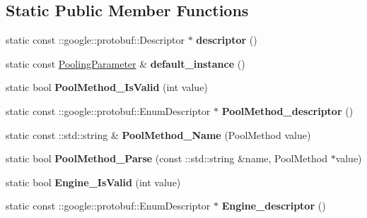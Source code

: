 \subsection*{Static Public Member Functions}
\begin{DoxyCompactItemize}
\item 
\mbox{\label{classcaffe_1_1_pooling_parameter_aa542d3765744ae40a109c427950d0617}} 
static const \+::google\+::protobuf\+::\+Descriptor $\ast$ {\bfseries descriptor} ()
\item 
\mbox{\label{classcaffe_1_1_pooling_parameter_ae648221442a7b54923a37772abd9d5cb}} 
static const \mbox{\hyperlink{classcaffe_1_1_pooling_parameter}{Pooling\+Parameter}} \& {\bfseries default\+\_\+instance} ()
\item 
\mbox{\label{classcaffe_1_1_pooling_parameter_ac9fc26961c16edc011b65bed9cb921d9}} 
static bool {\bfseries Pool\+Method\+\_\+\+Is\+Valid} (int value)
\item 
\mbox{\label{classcaffe_1_1_pooling_parameter_a4d15c3a7b87c7bb2a1b03d03d3a1169e}} 
static const \+::google\+::protobuf\+::\+Enum\+Descriptor $\ast$ {\bfseries Pool\+Method\+\_\+descriptor} ()
\item 
\mbox{\label{classcaffe_1_1_pooling_parameter_a5c43aeb29c00aba1da53d33a630007cd}} 
static const \+::std\+::string \& {\bfseries Pool\+Method\+\_\+\+Name} (Pool\+Method value)
\item 
\mbox{\label{classcaffe_1_1_pooling_parameter_a8ca05290753c02903fb7f7b0187627c5}} 
static bool {\bfseries Pool\+Method\+\_\+\+Parse} (const \+::std\+::string \&name, Pool\+Method $\ast$value)
\item 
\mbox{\label{classcaffe_1_1_pooling_parameter_acac2202952bc2f044f3d1cbcef10f043}} 
static bool {\bfseries Engine\+\_\+\+Is\+Valid} (int value)
\item 
\mbox{\label{classcaffe_1_1_pooling_parameter_a2a34d9329eb643e339655fcadf5d29ce}} 
static const \+::google\+::protobuf\+::\+Enum\+Descriptor $\ast$ {\bfseries Engine\+\_\+descriptor} ()

\end{DoxyCompactItemize}
